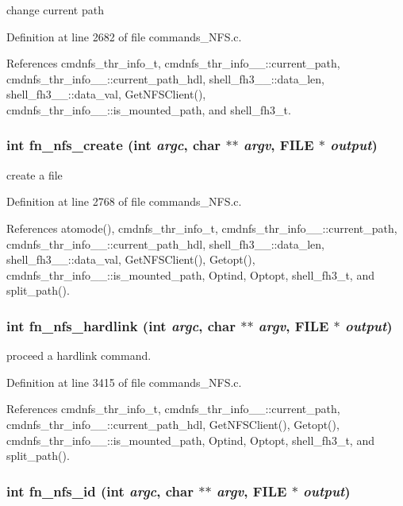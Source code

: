 change current path 

Definition at line 2682 of file commands\_\-NFS.c.

References cmdnfs\_\-thr\_\-info\_\-t, cmdnfs\_\-thr\_\-info\_\-\_\-::current\_\-path, cmdnfs\_\-thr\_\-info\_\-\_\-::current\_\-path\_\-hdl, shell\_\-fh3\_\-\_\-::data\_\-len, shell\_\-fh3\_\-\_\-::data\_\-val, Get\-NFSClient(), cmdnfs\_\-thr\_\-info\_\-\_\-::is\_\-mounted\_\-path, and shell\_\-fh3\_\-t.
\subsubsection{\setlength{\rightskip}{0pt plus 5cm}int fn\_\-nfs\_\-create (int {\em argc}, char $\ast$$\ast$ {\em argv}, FILE $\ast$ {\em output})}\label{commands_8h_a70}


create a file 

Definition at line 2768 of file commands\_\-NFS.c.

References atomode(), cmdnfs\_\-thr\_\-info\_\-t, cmdnfs\_\-thr\_\-info\_\-\_\-::current\_\-path, cmdnfs\_\-thr\_\-info\_\-\_\-::current\_\-path\_\-hdl, shell\_\-fh3\_\-\_\-::data\_\-len, shell\_\-fh3\_\-\_\-::data\_\-val, Get\-NFSClient(), Getopt(), cmdnfs\_\-thr\_\-info\_\-\_\-::is\_\-mounted\_\-path, Optind, Optopt, shell\_\-fh3\_\-t, and split\_\-path().
\subsubsection{\setlength{\rightskip}{0pt plus 5cm}int fn\_\-nfs\_\-hardlink (int {\em argc}, char $\ast$$\ast$ {\em argv}, FILE $\ast$ {\em output})}\label{commands_8h_a75}


proceed a hardlink command. 

Definition at line 3415 of file commands\_\-NFS.c.

References cmdnfs\_\-thr\_\-info\_\-t, cmdnfs\_\-thr\_\-info\_\-\_\-::current\_\-path, cmdnfs\_\-thr\_\-info\_\-\_\-::current\_\-path\_\-hdl, Get\-NFSClient(), Getopt(), cmdnfs\_\-thr\_\-info\_\-\_\-::is\_\-mounted\_\-path, Optind, Optopt, shell\_\-fh3\_\-t, and split\_\-path().
\subsubsection{\setlength{\rightskip}{0pt plus 5cm}int fn\_\-nfs\_\-id (int {\em argc}, char $\ast$$\ast$ {\em argv}, FILE $\ast$ {\em output})}\label{commands_8h_a79}




